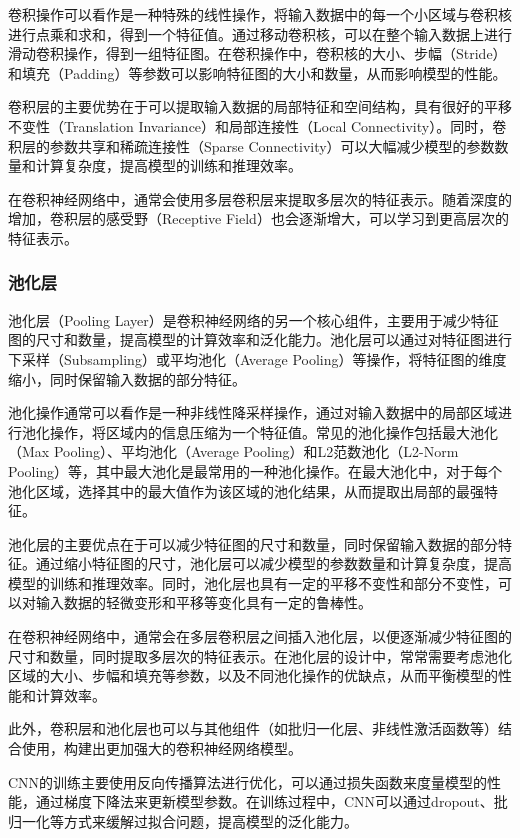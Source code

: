 卷积操作可以看作是一种特殊的线性操作，将输入数据中的每一个小区域与卷积核进行点乘和求和，得到一个特征值。通过移动卷积核，可以在整个输入数据上进行滑动卷积操作，得到一组特征图。在卷积操作中，卷积核的大小、步幅（Stride）和填充（Padding）等参数可以影响特征图的大小和数量，从而影响模型的性能。

卷积层的主要优势在于可以提取输入数据的局部特征和空间结构，具有很好的平移不变性（Translation Invariance）和局部连接性（Local Connectivity）。同时，卷积层的参数共享和稀疏连接性（Sparse Connectivity）可以大幅减少模型的参数数量和计算复杂度，提高模型的训练和推理效率。

在卷积神经网络中，通常会使用多层卷积层来提取多层次的特征表示。随着深度的增加，卷积层的感受野（Receptive Field）也会逐渐增大，可以学习到更高层次的特征表示。

\subsubsection{池化层}

池化层（Pooling Layer）是卷积神经网络的另一个核心组件，主要用于减少特征图的尺寸和数量，提高模型的计算效率和泛化能力。池化层可以通过对特征图进行下采样（Subsampling）或平均池化（Average Pooling）等操作，将特征图的维度缩小，同时保留输入数据的部分特征。

池化操作通常可以看作是一种非线性降采样操作，通过对输入数据中的局部区域进行池化操作，将区域内的信息压缩为一个特征值。常见的池化操作包括最大池化（Max Pooling）、平均池化（Average Pooling）和L2范数池化（L2-Norm Pooling）等，其中最大池化是最常用的一种池化操作。在最大池化中，对于每个池化区域，选择其中的最大值作为该区域的池化结果，从而提取出局部的最强特征。

池化层的主要优点在于可以减少特征图的尺寸和数量，同时保留输入数据的部分特征。通过缩小特征图的尺寸，池化层可以减少模型的参数数量和计算复杂度，提高模型的训练和推理效率。同时，池化层也具有一定的平移不变性和部分不变性，可以对输入数据的轻微变形和平移等变化具有一定的鲁棒性。

在卷积神经网络中，通常会在多层卷积层之间插入池化层，以便逐渐减少特征图的尺寸和数量，同时提取多层次的特征表示。在池化层的设计中，常常需要考虑池化区域的大小、步幅和填充等参数，以及不同池化操作的优缺点，从而平衡模型的性能和计算效率。

此外，卷积层和池化层也可以与其他组件（如批归一化层、非线性激活函数等）结合使用，构建出更加强大的卷积神经网络模型。

CNN的训练主要使用反向传播算法进行优化，可以通过损失函数来度量模型的性能，通过梯度下降法来更新模型参数。在训练过程中，CNN可以通过dropout、批归一化等方式来缓解过拟合问题，提高模型的泛化能力。

